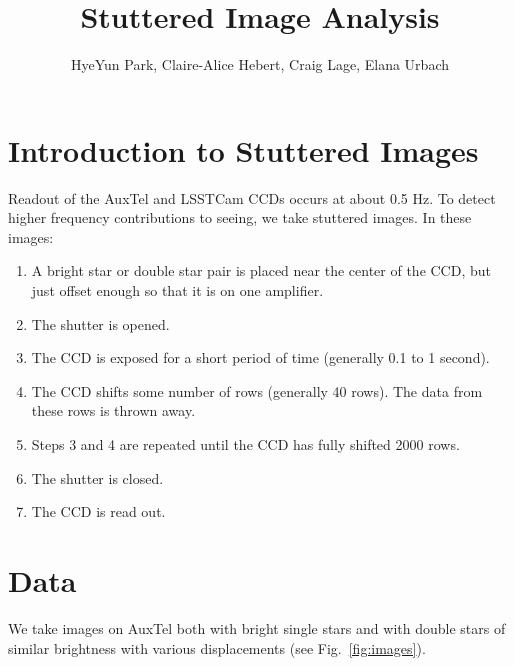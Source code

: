 \documentclass[SE,authoryear,toc]{lsstdoc}
\title{Stuttered Image Analysis}
\author{%
HyeYun Park, Claire-Alice Hebert, Craig Lage, Elana Urbach
}
\date{\vcsDate}
\begin{document}
\maketitle


\section{Introduction to Stuttered Images}

Readout of the AuxTel and LSSTCam CCDs occurs at about 0.5 Hz. To detect higher frequency contributions to seeing,
we take stuttered images. In these images:

\begin{enumerate}
  \item A bright star or double star pair is placed near the center of the CCD, but just offset enough so that it is on one amplifier.
  \item The shutter is opened.
  \item The CCD is exposed for a short period of time (generally 0.1 to 1 second).
  \item The CCD shifts some number of rows (generally 40 rows). The data from these rows is thrown away.
  \item Steps 3 and 4 are repeated until the CCD has fully shifted 2000 rows.
  \item The shutter is closed.
  \item The CCD is read out.
\end{enumerate}

\section{Data}

We take images on AuxTel both with bright single stars and with double stars of similar brightness with various displacements (see Fig.~\ref{fig:images}).
\end{document}
